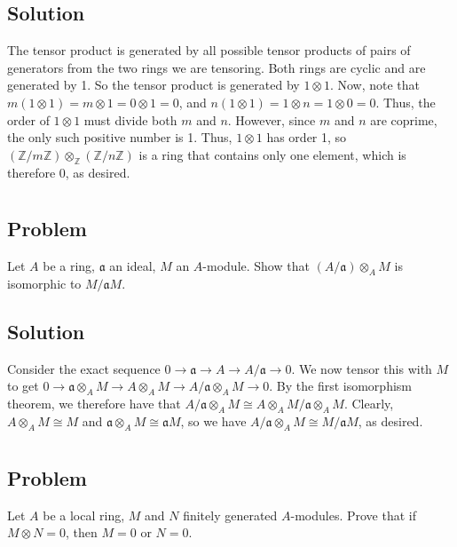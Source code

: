 \documentclass[book,12pt,oneside,openany]{memoir}
\begin{document}
\subsection{Solution}
The tensor product is generated by all possible tensor products of pairs of generators from the two rings we are tensoring. Both rings are cyclic and are generated by 1. So the tensor product is generated by $1 \otimes 1$.  Now, note that $m (1 \otimes 1) = m \otimes 1 = 0 \otimes 1 = 0$, and $n (1 \otimes 1) = 1 \otimes n = 1 \otimes 0 = 0$. Thus, the order of $1 \otimes 1$ must divide both $m$ and $n$. However, since $m$ and $n$ are coprime, the only such positive number is 1. Thus, $1 \otimes 1$ has order 1, so $\left( \mathbb{Z}/m\mathbb{Z} \right) \otimes_{\mathbb{Z}}  \left( \mathbb{Z}/n\mathbb{Z} \right)$ is a ring that contains only one element, which is therefore 0, as desired.

\section{}
\subsection{Problem}
Let $A$ be a ring, $\mathfrak{a}$ an ideal, $M$ an $A$-module. Show that $(A/\mathfrak{a}) \otimes_{A} M$ is isomorphic to $M/\mathfrak{a}M$.

\subsection{Solution}
Consider the exact sequence $0 \rightarrow \mathfrak{a} \rightarrow A \rightarrow A/\mathfrak{a} \rightarrow 0$. We now tensor this with $M$ to get $0 \rightarrow \mathfrak{a} \otimes_{A} M \rightarrow A \otimes_{A} M \rightarrow A/\mathfrak{a} \otimes_{A} M \rightarrow 0$. By the first isomorphism theorem, we therefore have that $A/\mathfrak{a} \otimes_{A} M \cong A \otimes_{A} M / \mathfrak{a} \otimes_A M$. Clearly, $A \otimes_A M \cong M$ and $\mathfrak{a} \otimes_{A} M \cong \mathfrak{a} M$, so we have $A/\mathfrak{a} \otimes_{A} M \cong M/\mathfrak{a}M$, as desired.

\section{}

\subsection{Problem}
Let $A$ be a local ring, $M$ and $N$ finitely generated $A$-modules. Prove that if $M \otimes N = 0$, then $M = 0$ or $N = 0$.
\end{document}

